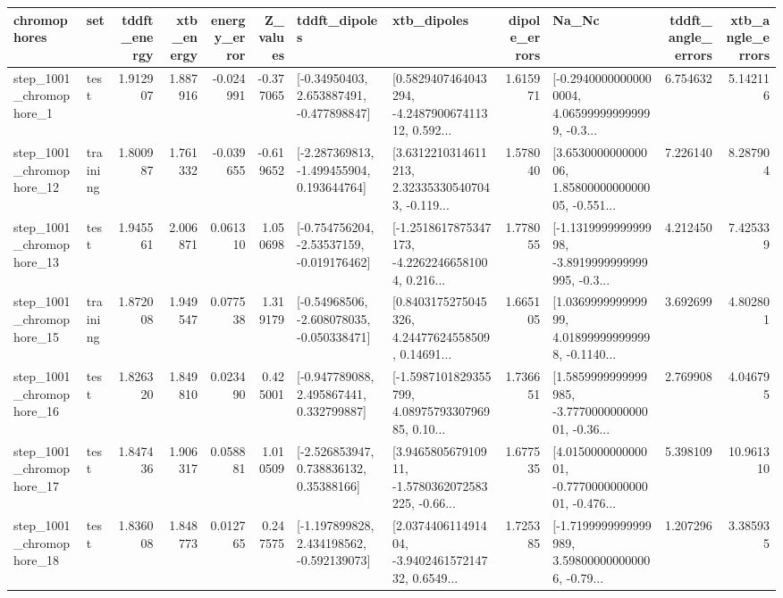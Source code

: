 \begin{tabular}{llrrrrllrlrr}
\toprule
             chromophores &       set &  tddft\_energy &  xtb\_energy &  energy\_error &  Z\_values &                               tddft\_dipoles &                                        xtb\_dipoles &  dipole\_errors &                                              Na\_Nc &  tddft\_angle\_errors &  xtb\_angle\_errors \\
\midrule
  step\_1001\_chromophore\_1 &      test &      1.912907 &    1.887916 &     -0.024991 & -0.377065 &    [-0.34950403, 2.653887491, -0.477898847] &  [0.5829407464043294, -4.248790067411312, 0.592... &       1.615971 &  [-0.29400000000000004, 4.065999999999999, -0.3... &            6.754632 &          5.142116 \\
 step\_1001\_chromophore\_12 &  training &      1.800987 &    1.761332 &     -0.039655 & -0.619652 &   [-2.287369813, -1.499455904, 0.193644764] &  [3.6312210314611213, 2.323353305407043, -0.119... &       1.578040 &  [3.653000000000006, 1.8580000000000005, -0.551... &            7.226140 &          8.287904 \\
 step\_1001\_chromophore\_13 &      test &      1.945561 &    2.006871 &      0.061310 &  1.050698 &   [-0.754756204, -2.53537159, -0.019176462] &  [-1.2518617875347173, -4.22622466581004, 0.216... &       1.778055 &  [-1.131999999999998, -3.8919999999999995, -0.3... &            4.212450 &          7.425339 \\
 step\_1001\_chromophore\_15 &  training &      1.872008 &    1.949547 &      0.077538 &  1.319179 &   [-0.54968506, -2.608078035, -0.050338471] &  [0.8403175275045326, 4.24477624558509, 0.14691... &       1.665105 &  [1.036999999999999, 4.018999999999998, -0.1140... &            3.692699 &          4.802801 \\
 step\_1001\_chromophore\_16 &      test &      1.826320 &    1.849810 &      0.023490 &  0.425001 &    [-0.947789088, 2.495867441, 0.332799887] &  [-1.5987101829355799, 4.0897579330796985, 0.10... &       1.736651 &  [1.5859999999999985, -3.777000000000001, -0.36... &            2.769908 &          4.046795 \\
 step\_1001\_chromophore\_17 &      test &      1.847436 &    1.906317 &      0.058881 &  1.010509 &     [-2.526853947, 0.738836132, 0.35388166] &  [3.946580567910911, -1.5780362072583225, -0.66... &       1.677535 &  [4.015000000000001, -0.777000000000001, -0.476... &            5.398109 &         10.961310 \\
 step\_1001\_chromophore\_18 &      test &      1.836008 &    1.848773 &      0.012765 &  0.247575 &   [-1.197899828, 2.434198562, -0.592139073] &  [2.037440611491404, -3.940246157214732, 0.6549... &       1.725385 &  [-1.7199999999999989, 3.598000000000006, -0.79... &            1.207296 &          3.385935 \\

\end{tabular}

